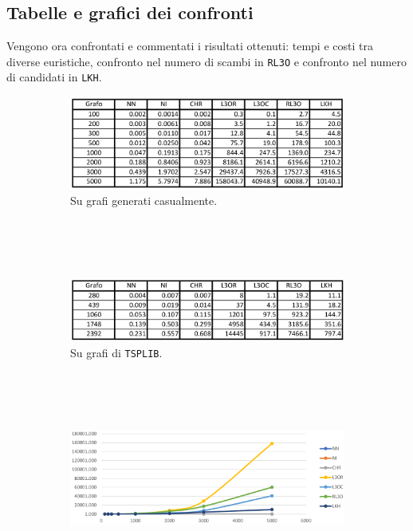 \newpage
\subsection{Tabelle e grafici dei confronti}

Vengono ora confrontati e commentati i risultati ottenuti: tempi e costi tra diverse euristiche, confronto 
nel numero di scambi in \texttt{RL3O} e confronto nel numero di candidati in \texttt{LKH}.

\begin{figure}[H]
    \centering
    \begin{subfigure}{\linewidth}
        \centering
        \includegraphics[width=320pt]{img/ConfrontoTempiRandom.png}
        \caption*{Su grafi generati casualmente.}
    \end{subfigure}
    \ \\
    \ \\
    \ \\
    \begin{subfigure}{\linewidth}
        \centering
        \includegraphics[width=320pt]{img/ConfrontoTempiTsplib.png}
        \caption*{Su grafi di \texttt{TSPLIB}.}
    \end{subfigure}
    \ \\
    \ \\
    \ \\
    \begin{subfigure}{\linewidth}
        \centering
        \includegraphics[width=300pt]{img/GraficoTempiRandom.png}

\end{subfigure}
\end{figure}
